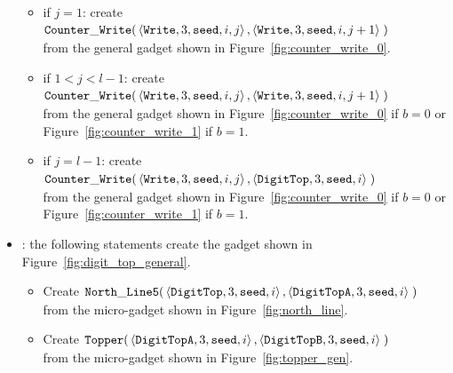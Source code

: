 \begin{itemize}
\begin{itemize}
        \item if $j = 1$: create
        $\begin{aligned}[t]
            {\tt Counter\_Write}(&\left\langle {\tt Write}, 3, {\tt seed}, i, j \right\rangle, \left\langle {\tt Write}, 3, {\tt seed}, i, j + 1 \right\rangle \;)
        \end{aligned}$\\from the general gadget shown in Figure~\ref{fig:counter_write_0}.

        \item if $1 < j < l-1$: create
        $\begin{aligned}[t]
            {\tt Counter\_Write}(&\left\langle {\tt Write}, 3, {\tt seed}, i, j \right\rangle, \left\langle {\tt Write}, 3, {\tt seed}, i, j + 1 \right\rangle \;)
        \end{aligned}$\\from the general gadget shown in Figure~\ref{fig:counter_write_0} if $b = 0$ or Figure~\ref{fig:counter_write_1} if $b = 1$.

        \item if $j = l-1$: create
        $\begin{aligned}[t]
            {\tt Counter\_Write}(&\left\langle {\tt Write}, 3, {\tt seed}, i, j \right\rangle, \left\langle {\tt DigitTop}, 3, {\tt seed}, i \right\rangle \;)
        \end{aligned}$\\from the general gadget shown in Figure~\ref{fig:counter_write_0} if $b = 0$ or Figure~\ref{fig:counter_write_1} if $b = 1$.
    \end{itemize}

    \item {\dtop}: the following statements create the gadget shown in Figure~\ref{fig:digit_top_general}.
    \begin{itemize}
        \item Create
        $\begin{aligned}[t]
            {\tt North\_Line5}(&\left\langle {\tt DigitTop},  3, {\tt seed}, i \right\rangle,
                                \left\langle {\tt DigitTopA}, 3, {\tt seed}, i \right\rangle \;)
        \end{aligned}$\\from the micro-gadget shown in Figure~\ref{fig:north_line}.

        \item Create
        $\begin{aligned}[t]
            {\tt Topper}(&\left\langle {\tt DigitTopA}, 3, {\tt seed}, i \right\rangle,
                          \left\langle {\tt DigitTopB}, 3, {\tt seed}, i \right\rangle \;)
        \end{aligned}$\\from the micro-gadget shown in Figure~\ref{fig:topper_gen}.


\end{itemize}
\end{itemize}
